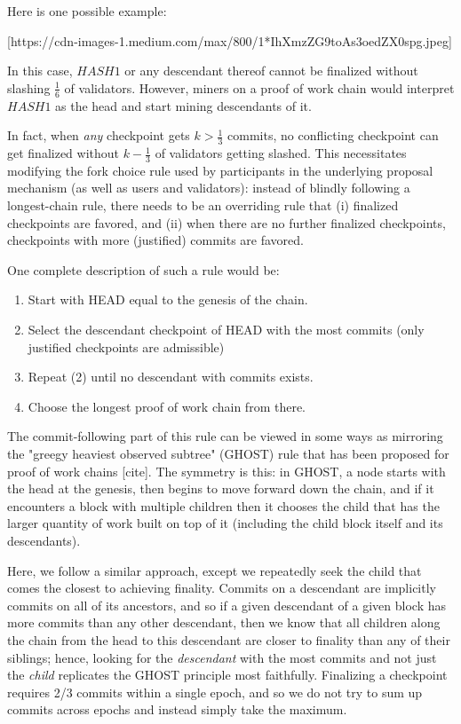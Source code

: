 \documentclass[12pt]{article}
\begin{document}
Here is one possible example:

[https://cdn-images-1.medium.com/max/800/1*IhXmzZG9toAs3oedZX0spg.jpeg]

In this case, $HASH1$ or any descendant thereof cannot be finalized without slashing $\frac{1}{6}$ of validators. However, miners on a proof of work chain would interpret $HASH1$ as the head and start mining descendants of it.

In fact, when \textit{any} checkpoint gets $k > \frac{1}{3}$ commits, no conflicting checkpoint can get finalized without $k - \frac{1}{3}$ of validators getting slashed. This necessitates modifying the fork choice rule used by participants in the underlying proposal mechanism (as well as users and validators): instead of blindly following a longest-chain rule, there needs to be an overriding rule that (i) finalized checkpoints are favored, and (ii) when there are no further finalized checkpoints, checkpoints with more (justified) commits are favored.

One complete description of such a rule would be:

\begin{enumerate}
\item Start with HEAD equal to the genesis of the chain.
\item Select the descendant checkpoint of HEAD with the most commits (only justified checkpoints are admissible)
\item Repeat (2) until no descendant with commits exists.
\item Choose the longest proof of work chain from there.
\end{enumerate}

The commit-following part of this rule can be viewed in some ways as mirroring the "greegy heaviest observed subtree" (GHOST) rule that has been proposed for proof of work chains [cite]. The symmetry is this: in GHOST, a node starts with the head at the genesis, then begins to move forward down the chain, and if it encounters a block with multiple children then it chooses the child that has the larger quantity of work built on top of it (including the child block itself and its descendants).

Here, we follow a similar approach, except we repeatedly seek the child that comes the closest to achieving finality. Commits on a descendant are implicitly commits on all of its ancestors, and so if a given descendant of a given block has more commits than any other descendant, then we know that all children along the chain from the head to this descendant are closer to finality than any of their siblings; hence, looking for the \textit{descendant} with the most commits and not just the \textit{child} replicates the GHOST principle most faithfully. Finalizing a checkpoint requires 2/3 commits within a single epoch, and so we do not try to sum up commits across epochs and instead simply take the maximum.
\end{document}
